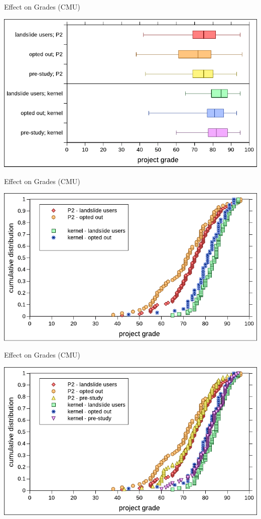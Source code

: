 \documentclass[xcolor=dvipsnames]{beamer}
\begin{document}
\begin{frame}{Effect on Grades (CMU)}
	\begin{center}
		\includegraphics[width=\textwidth]{../photo-of-ze-studence.pdf}
	\end{center}
\end{frame}

\begin{frame}{Effect on Grades (CMU)} %
	\begin{center}
		\includegraphics[width=\textwidth]{photo-of-ze-studence-cdf-no-pre-study.pdf}
	\end{center}
\end{frame}

\begin{frame}{Effect on Grades (CMU)} %
	\begin{center}
		\includegraphics[width=\textwidth]{../photo-of-ze-studence-cdf.pdf}
	\end{center}
\end{frame}
\end{document}
